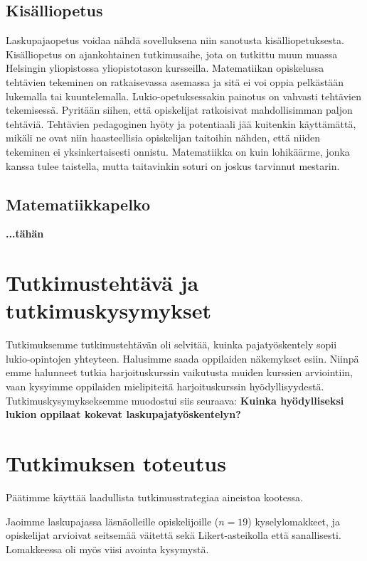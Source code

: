 \documentclass[a4paper,12pt,leqno,titlepage]{article}
\begin{document}
\subsection{Kisälliopetus}
Laskupajaopetus voidaa nähdä sovelluksena niin sanotusta kisälliopetuk\-sesta. Kisälliopetus on ajankohtainen tutkimusaihe, jota on tutkittu muun muassa Helsingin yliopistossa yliopistotason kursseilla. Matematiikan opiske\-lussa tehtävien tekeminen on ratkaisevassa asemassa ja sitä ei voi oppia pelkästään lukemalla tai kuuntelemalla. Lukio-opetuksessakin painotus on vahvasti tehtävien tekemisessä. Pyritään siihen, että opiskelijat ratkoisivat mahdollisimman paljon tehtäviä. Tehtävien pedagoginen hyöty ja potentiaali jää kuitenkin käyttämättä, mikäli ne ovat niin haasteellisia opiskelijan taitoihin nähden, että niiden tekeminen ei yksinkertaisesti onnistu. Mate\-ma\-tiikka on kuin lohikäärme, jonka kanssa tulee taistella, mutta taitavinkin soturi on joskus tarvinnut mestarin.
\subsection{Matematiikkapelko}
\textbf{...tähän}

\pagebreak
\section{Tutkimustehtävä ja tutkimuskysymykset}
Tutkimuksemme tutkimustehtävän oli selvitää, kuinka pajatyöskentely sopii lukio-opintojen yhteyteen.
Halusimme saada oppilaiden näkemykset esiin.
Niinpä emme halunneet tutkia harjoituskurssin vaikutusta muiden kurssien arviointiin, vaan kysyimme oppilaiden mielipiteitä harjoituskurssin hyödyllisyydestä.
Tutkimuskysymykseksemme muodostui siis seuraava:
\textbf{Kuinka hyödylliseksi lukion oppilaat kokevat laskupajatyöskentelyn?}

\section{Tutkimuksen toteutus} %
Päätimme käyttää laadullista tutkimusstrategiaa aineistoa kootessa.

Jaoimme laskupajassa läsnäolleille opiskelijoille ($n=19$) kyselylomakkeet, ja opiskelijat arvioivat seitsemää väitettä sekä Likert-asteikolla että sanallisesti.
Lomakkeessa oli myös viisi avointa kysymystä.
\end{document}
